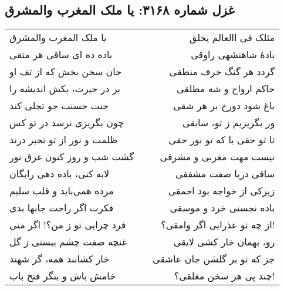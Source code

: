 \begin{center}
\section*{غزل شماره ۳۱۶۸: یا ملک المغرب والمشرق}
\label{sec:3168}
\begin{longtable}{l p{0.5cm} r}
یا ملک المغرب والمشرق
&&
مثلک فی االعالم یخلق
\\
باده ده ای ساقی هر متقی
&&
بادهٔ شاهنشهی راوقی
\\
جان سخن بخش که از تف او
&&
گردد هر گنگ خرف منطقی
\\
بر در حیرت، بکش اندیشه را
&&
حاکم ارواح و شه مطلقی
\\
جنت حسنت جو تجلی کند
&&
باغ شود دورخ بر هر شقی
\\
چون بگریزی نرسد در تو کس
&&
ور بگریزیم ز تو، سابقی
\\
ظلمت و نور از تو تحیر درند
&&
تا تو حقی یا که تو نور حقی
\\
گشت شب و روز کنون غرق نور
&&
نیست مهت مغربی و مشرقی
\\
لابه کنی، باده دهی رایگان
&&
ساقی دریا صفت مشفقی
\\
مرده همی‌باید و قلب سلیم
&&
زیرکی از خواجه بود احمقی
\\
فکرت اگر راحت جانها بدی
&&
باده نجستی خرد و موسقی
\\
فرد چرایی تو ز من؟! اگر منی
&&
از چه تو عذرایی اگر وامقی؟!
\\
غنچه صفت چشم ببستی ز گل
&&
رو، بهمان خار کشی لایقی
\\
خار کشانند همه، گر شهند
&&
جز که تو بر گلشن جان عاشقی
\\
خامش باش و بنگر فتح باب
&&
چند پی هر سخن مغلقی؟!
\\
\end{longtable}
\end{center}
